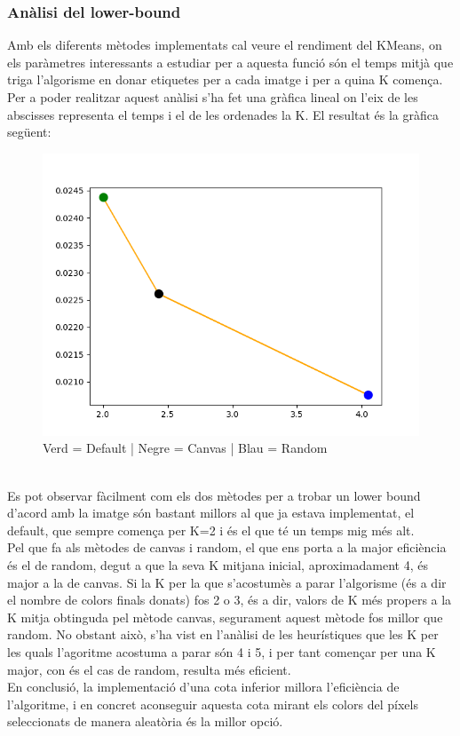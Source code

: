 \documentclass[a4paper, 11pt]{article}
\begin{document}
\subsubsection{Anàlisi del lower-bound}
Amb els diferents mètodes implementats cal veure el rendiment del KMeans, on els paràmetres interessants a estudiar per a aquesta funció són el temps mitjà que triga l'algorisme en donar etiquetes per a cada imatge i per a quina K comença. Per a poder realitzar aquest anàlisi s'ha fet una gràfica lineal on l'eix de les abscisses representa el temps i el de les ordenades la K. El resultat és la gràfica següent:
\begin{figure}[h!]
\centering
\includegraphics[scale=0.6]{lower.png}
\caption*{\footnotesize Verd = Default | Negre = Canvas | Blau = Random}
\end{figure}\\
Es pot observar fàcilment com els dos mètodes per a trobar un lower bound d'acord amb la imatge són bastant millors al que ja estava implementat, el default, que sempre comença per K=2 i és el que té un temps mig més alt.\\
Pel que fa als mètodes de canvas i random, el que ens porta a la major eficiència és el de random, degut a que la seva K mitjana inicial, aproximadament 4, és major a la de canvas. Si la K per la que s'acostumès a parar l'algorisme (és a dir el nombre de colors finals donats) fos 2 o 3, és a dir, valors de K més propers a la K mitja obtinguda pel mètode canvas, segurament aquest mètode fos millor que random. No obstant això, s'ha vist en l'anàlisi de les heurístiques que les K per les quals l'agoritme acostuma a parar són 4 i 5, i per tant començar per una K major, con és el cas de random, resulta més eficient.\\
En conclusió, la implementació d'una cota inferior millora l'eficiència de l'algoritme, i en concret aconseguir aquesta cota mirant els colors del píxels seleccionats de manera aleatòria és la millor opció.
\end{document}
